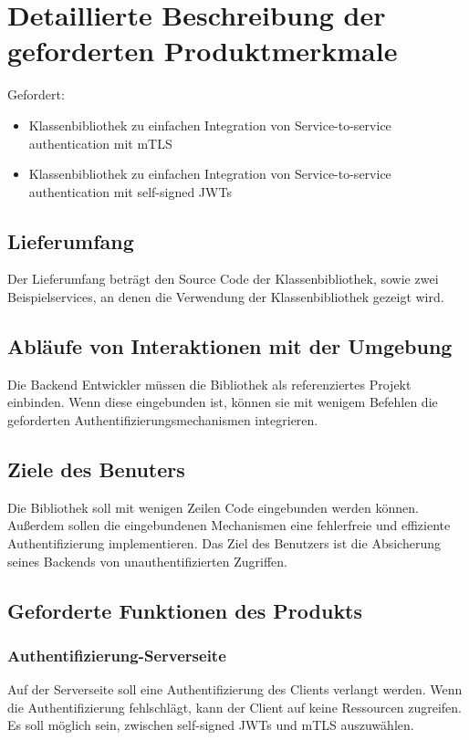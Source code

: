 \documentclass[14pt,a4paper]{extarticle}
\begin{document}
	\section{Detaillierte Beschreibung der geforderten Produktmerkmale}
	Gefordert:
	\begin{itemize}
		\item Klassenbibliothek zu einfachen Integration von Service-to-service authentication mit mTLS
		\item Klassenbibliothek zu einfachen Integration von Service-to-service authentication mit self-signed JWTs
	\end{itemize}

	\subsection{Lieferumfang}
	Der Lieferumfang beträgt den Source Code der Klassenbibliothek, sowie zwei Beispielservices, an denen die Verwendung der Klassenbibliothek gezeigt wird.

	\subsection{Abläufe von Interaktionen mit der Umgebung}
	Die Backend Entwickler müssen die Bibliothek als referenziertes Projekt einbinden. 
	Wenn diese eingebunden ist, können sie mit wenigem Befehlen die geforderten Authentifizierungsmechanismen integrieren.

	\subsection{Ziele des Benuters}
	Die Bibliothek soll mit wenigen Zeilen Code eingebunden werden können.
	Außerdem sollen die eingebundenen Mechanismen eine fehlerfreie und effiziente Authentifizierung implementieren.
	Das Ziel des Benutzers ist die Absicherung seines Backends von unauthentifizierten Zugriffen.

	\subsection{Geforderte Funktionen des Produkts}
	\subsubsection{Authentifizierung-Serverseite}
	Auf der Serverseite soll eine Authentifizierung des Clients verlangt werden.
	Wenn die Authentifizierung fehlschlägt, kann der Client auf keine Ressourcen zugreifen.
	Es soll möglich sein, zwischen self-signed JWTs und mTLS auszuwählen.
\end{document}
